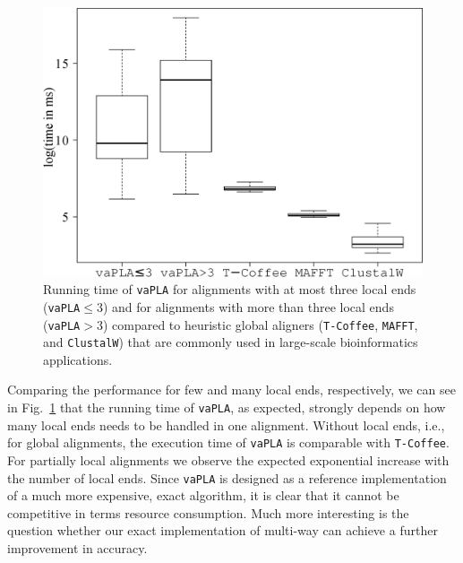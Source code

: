 \documentclass[a4paper,10pt]{article}
\newcommand{\TODO}[1]{\begingroup\color{red}#1\endgroup}
\newcommand{\SAFTWARE}{\texttt{vaPLA}} %
\begin{document}
\begin{figure}
  \begin{center}
    \includegraphics[width=1\columnwidth]{times_combined.eps}
  \end{center}
  \caption{Running time of \SAFTWARE{} for alignments with at most three
    local ends (\SAFTWARE$\le3$) and for alignments with more than three
    local ends (\SAFTWARE$>3$) compared to heuristic global aligners
    (\texttt{T-Coffee}, \texttt{MAFFT}, and \texttt{ClustalW}) that are
    commonly used in large-scale bioinformatics applications.}
  \label{fig:manyLoc}
\end{figure}

Comparing the performance for few and many local ends, respectively,
  we can see in Fig.~\ref{fig:manyLoc} that the running time of \SAFTWARE,
as expected, strongly depends on how many local ends needs to be handled in
one alignment. Without local ends, i.e., for global alignments, the
execution time of \SAFTWARE{} is comparable with \texttt{T-Coffee}. For
partially local alignments we observe the expected exponential increase
with the number of local ends. Since \SAFTWARE{} is designed as a reference
implementation of a much more expensive, exact algorithm, it is clear that
it cannot be competitive in terms resource consumption. Much more
interesting is the question whether our exact implementation of multi-way
can achieve a further improvement in accuracy.
\end{document}
